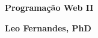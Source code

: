 \thispagestyle{empty}

\begin{center}

\vspace*{\fill}

\textbf{\color{verde_UnB}\fontsize{30pt}{35pt}\selectfont \textbf{Programação Web II}}

\vfill

{\textbf{\fontsize{13pt}{15.6pt}\selectfont \centering  Leo Fernandes, PhD}}



\vspace*{\fill}

\end{center}

\newpage